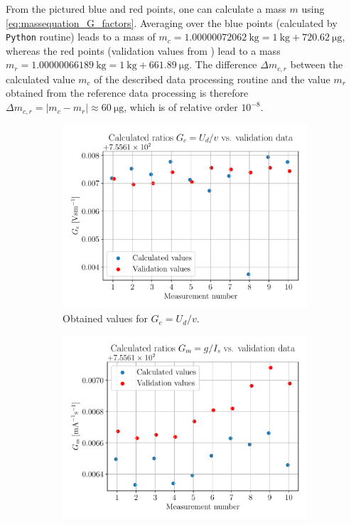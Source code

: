 \documentclass{report}
\numberwithin{tm}{section}
\begin{document}
From the pictured blue and red points, one can calculate a mass $m$ using \cref{eq:massequation_G_factors}. Averaging over the blue points (calculated by \verb|Python| routine) leads to a mass of $m_c = \SI{1.00000072062}{\kilogram} = \SI{1}{\kilogram} + \SI{720.62}{\micro\gram}$, whereas the red points (validation values from \cite{Eichenberger_2022}) lead to a mass $m_r = \SI{1.00000066189}{\kilogram} = \SI{1}{\kilogram} + \SI{661.89}{\micro\gram}$. The difference $\Delta m_{c,r}$ between the calculated value $m_c$ of the described data processing routine and the value $m_r$ obtained from the reference data processing is therefore $\Delta m_{c,r} = |m_c-m_r| \approx \SI{60}{\micro\gram}$, which is of relative order $10^{-8}$.
\begin{figure}[h]
	\centering
	\begin{subfigure}{0.49\textwidth}
		 \centering
		 \includegraphics[width=\textwidth]{figures/u_v_example.pdf}
		 \caption{Obtained values for $G_e =U_d/v$.}
		 \label{fig:example_u_v}
	\end{subfigure}
	\hfill
	\begin{subfigure}{0.49\textwidth}
		\centering
		\includegraphics[width=\textwidth]{figures/g_i_example.pdf}

\end{subfigure}
\end{figure}
\end{document}
